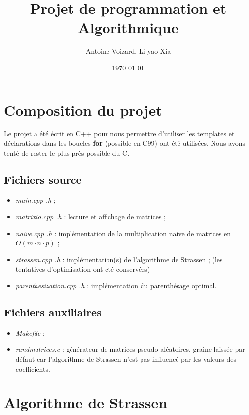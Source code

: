 \documentclass[a4paper]{article}
\begin{document}
\title{Projet de programmation et Algorithmique}
\author{Antoine Voizard, Li-yao Xia}
\date{\today}

\maketitle

\section{Composition du projet}

Le projet a été écrit en C++ pour nous permettre d'utiliser les
templates et déclarations dans les boucles {\bf for}
(possible en C99) ont été utilisées. Nous avons tenté de
rester le plus près possible du C.

\subsection{Fichiers source}

\begin{itemize}
  \item {\it main.cpp .h} ;
  \item {\it matrixio.cpp .h} : lecture et affichage de matrices ;
  \item {\it naive.cpp .h} : implémentation de la multiplication naive
  de matrices en $O(m \cdot n \cdot p)$ ;
  \item {\it strassen.cpp .h} : implémentation(s) de l'algorithme de
  Strassen ; (les tentatives d'optimisation ont été conservées)
  \item {\it parenthesization.cpp .h} : implémentation du parenthésage
  optimal.
\end{itemize}

\subsection{Fichiers auxiliaires}

\begin{itemize}
  \item {\it Makefile} ;
  \item {\it randmatrices.c} : générateur de matrices pseudo-aléatoires,
  graine laissée par défaut car l'algorithme de Strassen n'est pas
  influencé par les valeurs des coefficients.
\end{itemize}

\section{Algorithme de Strassen}
\end{document}
